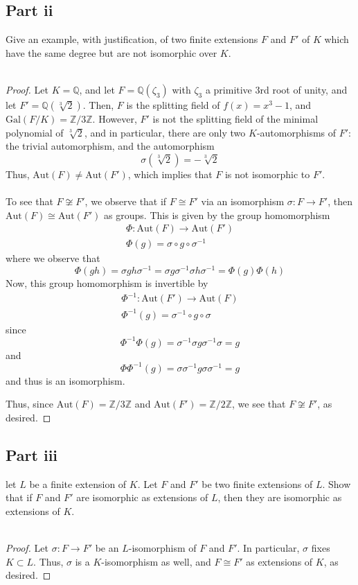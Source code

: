 \documentclass[12pt,reqno]{amsart}
\newcommand{\Z}{\mathbb{Z}}
\newcommand{\Q}{\mathbb{Q}}
\begin{document}
\subsection*{Part ii}
Give an example, with justification, of two finite extensions $F$ and $F'$ of
$K$ which have the same degree but are not isomorphic over $K$.
\\
\\
\begin{proof}
    Let $K=\Q$, and let $F = \Q(\zeta_3)$ with $\zeta_3$ a primitive $3$rd root of
    unity, and let $F' = \Q(\sqrt[3]{2})$. Then, $F$ is the splitting field of
    $f(x) = x^3-1$, and $\text{Gal}(F/K)=\Z/{3\Z}$. However, $F'$ is not the
    splitting field of the minimal polynomial of $\sqrt[3]{2}$, and in
    particular, there are only two $K$-automorphisms of $F'$: the trivial
    automorphism, and the automorphism
    \[
        \sigma(\sqrt[3]{2}) = -\sqrt[3]{2}
    \]
    Thus, $\text{Aut}(F)\neq \text{Aut}(F')$, which implies that $F$ is not
    isomorphic to $F'$.
    \\
    \\
    To see that $F\not\cong F'$, we observe that if $F\cong F'$ via an
    isomorphism $\sigma:F\to F'$, then $\text{Aut}(F)\cong\text{Aut}(F')$ as
    groups.  This is given by the group homomorphism
    \[
        \begin{aligned}
        \Phi:\text{Aut}(F)\to\text{Aut}(F')\\
        \Phi(g) = \sigma\circ g\circ \sigma^{-1}
    \end{aligned}
    \]
    where we observe that
    \[
        \Phi(gh) = \sigma gh\sigma^{-1} = \sigma g\sigma^{-1}\sigma h\sigma^{-1}
        = \Phi(g)\Phi(h)
    \]
    Now, this group homomorphism is invertible by
    \[
\begin{aligned}
    \Phi^{-1}:\text{Aut}(F')\to\text{Aut}(F)\\
    \Phi^{-1}(g) = \sigma^{-1}\circ g\circ \sigma
\end{aligned}
    \]
    since
    \[
        \Phi^{-1}\Phi(g) = \sigma^{-1}\sigma g\sigma^{-1}\sigma = g
    \]
    and
    \[
        \Phi\Phi^{-1}(g) = \sigma\sigma^{-1}g\sigma\sigma^{-1} = g
    \]
    and thus is an isomorphism.

    Thus, since $\text{Aut}(F) = \Z/{3\Z}$ and $\text{Aut}(F') = \Z/{2\Z}$, we
    see that $F\not\cong F'$, as desired.
\end{proof}

\subsection*{Part iii}
let $L$ be a finite extension of $K$. Let $F$ and $F'$ be two finite extensions
of $L$. Show that if $F$ and $F'$ are isomorphic as extensions of $L$, then they
are isomorphic as extensions of $K$.
\\
\\
\begin{proof}
    Let $\sigma:F\to F'$ be an $L$-isomorphism of $F$ and $F'$. In particular,
    $\sigma$ fixes $K\subset L$. Thus, $\sigma$ is a $K$-isomorphism as well,
    and $F\cong F'$ as extensions of $K$, as desired.
\end{proof}
\end{document}
